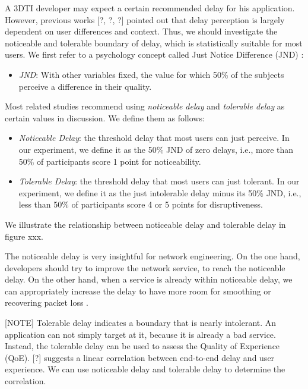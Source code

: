 A 3DTI developer may expect a certain recommended delay for his application. However, previous works \cite{montagud2012inter} [?, ?, ?] pointed out that delay perception is largely dependent on user differences and context. Thus, we should investigate the noticeable and tolerable boundary of delay, which is statistically suitable for most users. We first refer to a psychology concept called Just Notice Difference (JND) \cite{xu2013exploiting, sat2009statistical}:

\begin{itemize}
    \item \emph{JND}: With other variables fixed, the value for which 50\% of the subjects perceive a difference in their quality.
\end{itemize}

Most related studies recommend using \emph{noticeable delay} and \emph{tolerable delay} as certain values in discussion. We define them as follows:

\begin{itemize}
    \item \emph{Noticeable Delay}: the threshold delay that most users can just perceive. In our experiment, we define it as the 50\% JND of zero delays, i.e., more than 50\% of participants score 1 point for noticeability.
    
    \item \emph{Tolerable Delay}: the threshold delay that most users can just tolerant. In our experiment, we define it as the just intolerable delay minus its 50\% JND, i.e., less than 50\% of participants score 4 or 5 points for disruptiveness.
\end{itemize}

We illustrate the relationship between noticeable delay and tolerable delay in figure xxx.

The noticeable delay is very insightful for network engineering. On the one hand, developers should try to improve the network service, to reach the noticeable delay. On the other hand, when a service is already within noticeable delay, we can appropriately increase the delay to have more room for smoothing or recovering packet loss \cite{xu2013exploiting}.

[NOTE] Tolerable delay indicates a boundary that is nearly intolerant. An application can not simply target at it, because it is already a bad service. Instead, the tolerable delay can be used to assess the Quality of Experience (QoE). [?] suggests a linear correlation between end-to-end delay and user experience. We can use noticeable delay and tolerable delay to determine the correlation.

